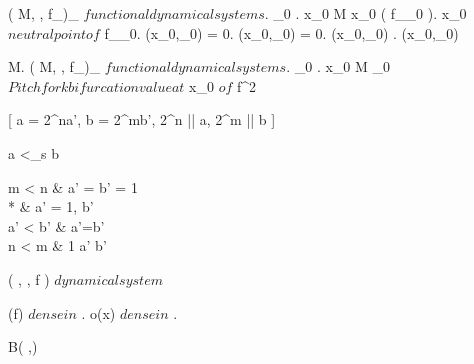 \documentclass[../Main/main]{subfiles}
\begin{document}
{	
	{
		{
			( M, \N, f_\lambda )_{\lambda \in \Lambda} $ functional dynamical systems $.
			\lambda_0 \in \Lambda.
			x_0 \in M
		}
		{
			x_0 \in \fixed( f_{\lambda_0} ).
			x_0 $ neutral point of $ f_{\lambda_0}.
			(x_0,\lambda_0) = 0.
			(x_0,\lambda_0) = 0.
			(x_0,\lambda_0) .
			(x_0,\lambda_0) 
		}
	}
	
	
	{
		{
			\Lambda \subset M.
			( M, \N, f_\lambda )_{\lambda \in \Lambda} $ functional dynamical systems $.
			\lambda_0 \in \Lambda.
			x_0 \in M
		}
		{
			\lambda_0 $ Pitchfork bifurcation value at $ x_0 $ of $ f^2
		}
	}

	\newpage


	{
		{
			[ a = 2^na', b = 2^mb', 2^n || a, 2^m || b ]
			{
				a <_s b \ifandonlyif 
			\begin{cases} 
			m < n & a' = b' = 1 \\ 
			* & a' = 1, b'  \\ 
			a' < b' & a'=b' \\ 
			n < m & 1 \neq a' \neq b'
			\end{cases}
			}
		}
	}
	
	
	{
		{
			( \R, \N, f ) $ dynamical system $
		}
		{
			\fixed(f) $ dense in $ \R.
			{
				o(x) $ dense in $ \R
			}.

			{
				\ex{ \epsilon \in \R^+ }
				{
					\all{ \delta \in \R^+ }
					{
						{
							 \nin B( ,\epsilon)
						}
					}
				}
			}
		}
	}
}
\end{document}
